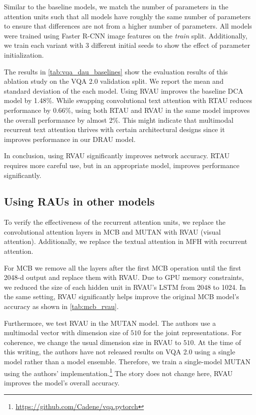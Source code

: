 \documentclass[times,twocolumn, final ,authoryear]{elsarticle}
\begin{document}
	Similar to the baseline models, we match the number of parameters in the attention units such that all models have roughly the same number of parameters to ensure that differences are not from a higher number of parameters. All models were trained using Faster R-CNN image features on the \textit{train} split. Additionally, we train each variant with 3 different initial seeds to
	show the effect of parameter initialization.

The results in \cref{tab:vqa_dau_baselines}  show the evaluation results of this ablation study on the VQA 2.0 validation split. We report the mean and standard deviation of the each model. Using RVAU improves
	the baseline \ac{DCA} model by 1.48\%. While swapping convolutional text attention with
	RTAU reduces performance by 0.66\%, using both RTAU and RVAU in the
	same model improves the overall performance by almost 2\%. This might
	indicate that multimodal recurrent text attention thrives with certain architectural designs since it improves performance in our DRAU model.

In conclusion, using \ac{RVAU} significantly improves network accuracy. \ac{RTAU} requires more careful use, but in an appropriate model, improves performance significantly.

\subsection{Using \acp{RAU} in other models}

To verify the effectiveness of the recurrent attention units, we replace the convolutional attention layers in MCB \citep{fukui2016} and MUTAN \citep{ben-younes2017} with RVAU (visual attention). Additionally, we replace the textual attention in MFH \citep{yu2017} with recurrent attention.

For MCB we remove all the layers after the first MCB operation until the first 2048-d output and replace them with RVAU. Due to GPU memory constraints, we reduced the size of each hidden unit in RVAU's LSTM from 2048 to 1024. In the same setting, RVAU significantly helps improve the original MCB model's accuracy as shown in  \cref{tab:mcb_rvau}.

Furthermore, we test RVAU in the MUTAN model. The authors use a multimodal vector with dimension size of $510$ for the joint representations. For coherence, we change the usual dimension size in RVAU to $510$. At the time of this writing, the authors have not released results on VQA 2.0 using a single model rather than a model ensemble. Therefore, we train a single-model MUTAN using the authors' implementation.\footnote{\url{https://github.com/Cadene/vqa.pytorch}} The story does not change here, RVAU improves the model's overall accuracy.
\end{document}

